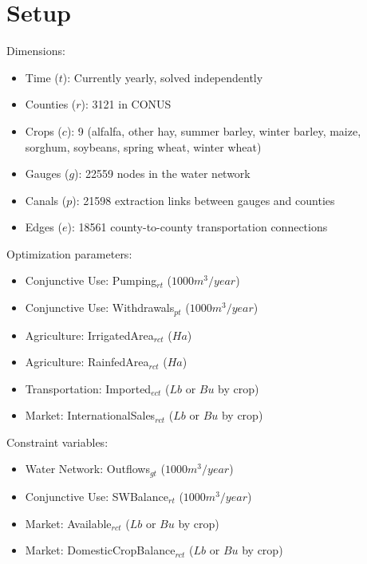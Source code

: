 \documentclass[11pt,oneside, landscape]{amsart}
\author{James Rising}
\date{}
\begin{document}
\section{Setup}

Dimensions:

\begin{minipage}{4in}
\begin{itemize}
\item Time ($t$): Currently yearly, solved independently
\item Counties ($r$): \num{3121} in CONUS
\item Crops ($c$): \num{9} (alfalfa, other hay, summer barley, winter
  barley, maize, sorghum, soybeans, spring wheat, winter wheat)
\item Gauges ($g$): \num{22559} nodes in the water network
\item Canals ($p$): \num{21598} extraction links between gauges and counties
\item Edges ($e$): \num{18561} county-to-county transportation
  connections
\end{itemize}
\end{minipage}

Optimization parameters:

\begin{itemize}
\item Conjunctive Use: Pumping$_{rt}$ ($1000 m^3 / year$)
\item Conjunctive Use: Withdrawals$_{pt}$ ($1000 m^3 / year$)
\item Agriculture: IrrigatedArea$_{rct}$ ($Ha$)
\item Agriculture: RainfedArea$_{rct}$ ($Ha$)
\item Transportation: Imported$_{ect}$ ($Lb$ or $Bu$ by crop)
\item Market: InternationalSales$_{rct}$ ($Lb$ or $Bu$ by crop)
\end{itemize}

Constraint variables:

\begin{itemize}
\item Water Network: Outflows$_{gt}$ ($1000 m^3 / year$)
\item Conjunctive Use: SWBalance$_{rt}$ ($1000 m^3 / year$)
\item Market: Available$_{rct}$ ($Lb$ or $Bu$ by crop)
\item Market: DomesticCropBalance$_{rct}$ ($Lb$ or $Bu$ by crop)
\end{itemize}
\end{document}
